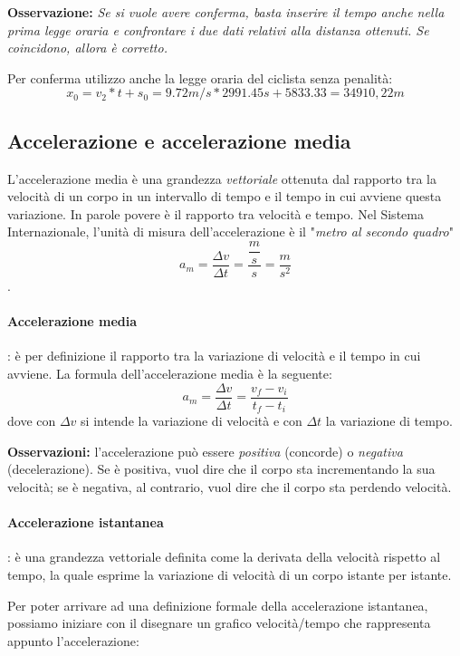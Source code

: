 \documentclass[11pt]{article}
\begin{document}
\textbf{Osservazione:} \textit{Se si vuole avere conferma, basta inserire il tempo anche nella prima legge oraria e confrontare i due dati relativi alla distanza ottenuti. Se coincidono, allora è corretto.} 


Per conferma utilizzo anche la legge oraria del ciclista senza penalità:
\begin{equation*}
 x_0 = v_2 * t + s_0 = 9.72m/s * 2991.45 s + 5833.33 = 34910,22 m
 \end{equation*} 

\subsection{Accelerazione e accelerazione media}
L'accelerazione media è una grandezza \textit{vettoriale} ottenuta dal rapporto tra la velocità di un corpo in un intervallo di tempo e il tempo in cui avviene questa variazione. In parole povere è il rapporto tra velocità e tempo. Nel Sistema Internazionale, l'unità di misura dell'accelerazione è il "\textit{metro al secondo quadro}" $$a_m = \dfrac{\Delta v}{\Delta t} = \dfrac{\dfrac{m}{s}}{s}  = \dfrac{m}{s^2}$$.

\paragraph{Accelerazione media}: è per definizione il rapporto tra la variazione di velocità e il tempo in cui avviene. La formula dell'accelerazione media è la seguente:
\begin{equation}
a_m = \dfrac{\Delta v}{\Delta t} = \dfrac{v_f -v_i}{t_f - t_i}
\end{equation}
dove con $\Delta v$ si intende la variazione di velocità e con $\Delta t$ la variazione di tempo.

\textbf{Osservazioni:} l'accelerazione può essere \textit{positiva} (concorde) o \textit{negativa} (decelerazione). Se è positiva, vuol dire che il corpo sta incrementando la sua velocità; se è negativa, al contrario, vuol dire che il corpo sta perdendo velocità.

\paragraph{Accelerazione istantanea}: è una grandezza vettoriale definita come la derivata della velocità rispetto al tempo, la quale esprime la variazione di velocità di un corpo istante per istante.

Per poter arrivare ad una definizione formale della accelerazione istantanea, possiamo iniziare con il disegnare un grafico velocità/tempo che rappresenta appunto l'accelerazione:
\end{document}
